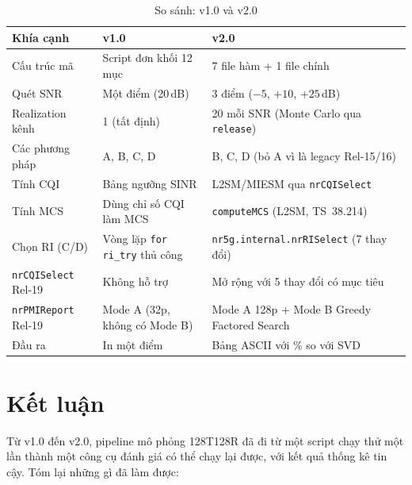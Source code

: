 \documentclass[11pt,a4paper]{article}
\begin{document}
\begin{table}[h!]
\centering
\caption{So sánh: v1.0 và v2.0}
\label{tab:comparison}
\begin{tabular}{lll}
\toprule
\textbf{Khía cạnh} & \textbf{v1.0} & \textbf{v2.0} \\
\midrule
Cấu trúc mã          & Script đơn khối 12 mục        & 7 file hàm + 1 file chính \\
Quét SNR             & Một điểm (20\,dB)             & 3 điểm ($-5$, $+10$, $+25$\,dB) \\
Realization kênh     & 1 (tất định)                  & 20 mỗi SNR (Monte Carlo qua \texttt{release}) \\
Các phương pháp      & A, B, C, D                    & B, C, D (bỏ A vì là legacy Rel-15/16) \\
Tính CQI             & Bảng ngưỡng SINR              & L2SM/MIESM qua \texttt{nrCQISelect} \\
Tính MCS             & Dùng chỉ số CQI làm MCS       & \texttt{computeMCS} (L2SM, TS~38.214) \\
Chọn RI (C/D)        & Vòng lặp \texttt{for ri\_try} thủ công & \texttt{nr5g.internal.nrRISelect} (7 thay đổi) \\
\texttt{nrCQISelect} Rel-19 & Không hỗ trợ & Mở rộng với 5 thay đổi có mục tiêu \\
\texttt{nrPMIReport} Rel-19 & Mode A (32p, không có Mode B) & Mode A 128p + Mode B Greedy Factored Search \\
Đầu ra               & In một điểm                   & Bảng ASCII với \% so với SVD \\
\bottomrule
\end{tabular}
\end{table}

\section{Kết luận}

Từ v1.0 đến v2.0, pipeline mô phỏng 128T128R đã đi từ một script chạy thử một lần
thành một công cụ đánh giá có thể chạy lại được, với kết quả thống kê tin cậy.
Tóm lại những gì đã làm được:
\end{document}
